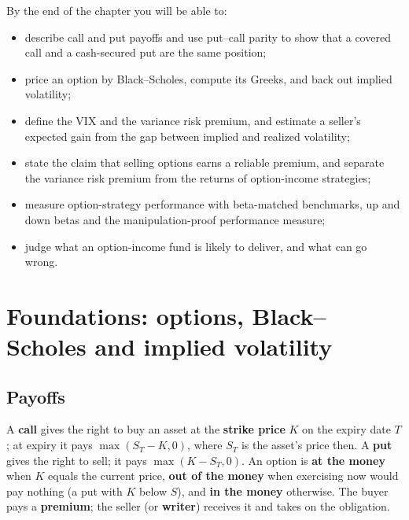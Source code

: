 By the end of the chapter you will be able to:

\begin{itemize}
  \item describe call and put payoffs and use put--call parity to show that a covered call and a cash-secured put are the same position;
  \item price an option by Black--Scholes, compute its Greeks, and back out implied volatility;
  \item define the VIX and the variance risk premium, and estimate a seller's expected gain from the gap between implied and realized volatility;
  \item state the claim that selling options earns a reliable premium, and separate the variance risk premium from the returns of option-income strategies;
  \item measure option-strategy performance with beta-matched benchmarks, up and down betas and the manipulation-proof performance measure;
  \item judge what an option-income fund is likely to deliver, and what can go wrong.
\end{itemize}

\section{Foundations: options, Black--Scholes and implied volatility}
\label{sec:16-foundations}

\subsection{Payoffs}

A \textbf{call} gives the right to buy an asset at the \textbf{strike price} $K$ on the expiry date $T$; at expiry it pays $\max(S_T - K, 0)$, where $S_T$ is the asset's price then. A \textbf{put} gives the right to sell; it pays $\max(K - S_T, 0)$. An option is \textbf{at the money} when $K$ equals the current price, \textbf{out of the money} when exercising now would pay nothing (a put with $K$ below $S$), and \textbf{in the money} otherwise. The buyer pays a \textbf{premium}; the seller (or \textbf{writer}) receives it and takes on the obligation.

